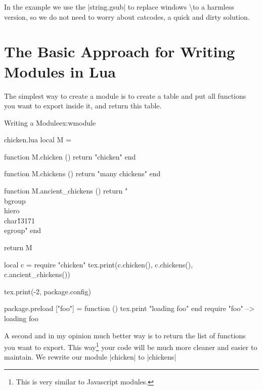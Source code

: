 In the example we use the |string.gsub| to replace windows \textbackslash to a harmless version, so we do not need to worry about catcodes, a quick and dirty solution. 

\section{The Basic Approach for Writing Modules in Lua}

The simplest way to create a module is to create a table and put all functions you want to export inside it, and return this table.

\begin{texexample}{Writing a Module}{ex:wmodule}
\begin{filecontents*}{chicken.lua}
local M = {}

function M.chicken ()
  return "chicken"
end

function M.chickens ()
  return "many chickens" 
end

function M.ancient_chickens ()
  return "\\bgroup\\hiero\\char\"13171 \\egroup"
end

return M
\end{filecontents*}

\begin{luacode*}
local c = require "chicken"
      tex.print(c.chicken(), c.chickens(), c.ancient_chickens())
      
      tex.print(-2, package.config)
      
      package.preload ["foo"] = function () tex.print "loading foo" end
require "foo"  --> loading foo
\end{luacode*}
\end{texexample}

A second and in my opinion much better way is to return the list of functions you want to export. This way\footnote{This is very similar to Javascript modules.} your code will be much more cleaner and easier to maintain. We rewrite our module |chicken|  to |chickens|

